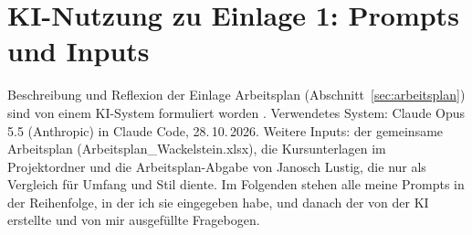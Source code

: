 \chapter{KI-Nutzung zu Einlage 1: Prompts und Inputs}
\label{anh:ki-arbeitsplan}

Beschreibung und Reflexion der Einlage Arbeitsplan (Abschnitt~\ref{sec:arbeitsplan}) sind von einem
KI-System formuliert worden \cite{Manevski2026KIArbeitsplan}. Verwendetes System: Claude Opus 5.5
(Anthropic) in Claude Code, 28.\,10.\,2026. Weitere Inputs: der gemeinsame Arbeitsplan
(Arbeitsplan\_Wackelstein.xlsx), die Kursunterlagen im Projektordner und die Arbeitsplan-Abgabe von
Janosch Lustig, die nur als Vergleich für Umfang und Stil diente. Im Folgenden stehen alle meine Prompts
in der Reihenfolge, in der ich sie eingegeben habe, und danach der von der KI erstellte und von mir
ausgefüllte Fragebogen.

